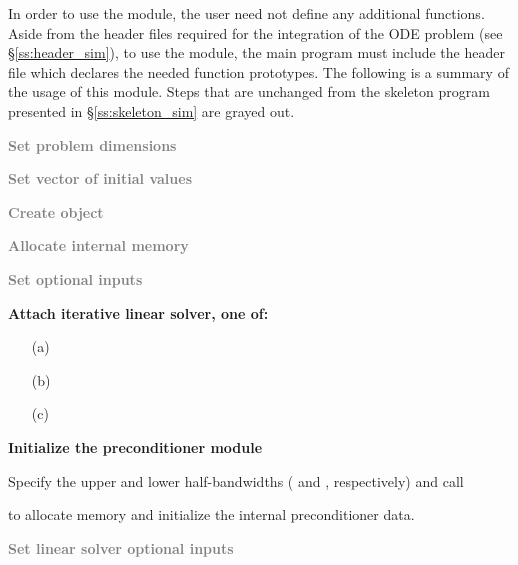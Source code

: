 In order to use the {\cvbandpre} module, the user need not define any
additional functions. 
Aside from the header files required for the integration of the ODE problem
(see \S\ref{ss:header_sim}),  to use the {\cvbandpre} module, the main program 
must include the header file  which declares the needed
function prototypes.
The following is a summary of the usage of this module. Steps that are unchanged from the skeleton
program presented in \S\ref{ss:skeleton_sim} are grayed out.
\begin{Steps}
  
\item
  \textcolor{gray}{\bf Set problem dimensions}

\item
  \textcolor{gray}{\bf Set vector of initial values}
 
\item
  \textcolor{gray}{\bf Create {\cvode} object}

\item
  \textcolor{gray}{\bf Allocate internal memory}

\item
  \textcolor{gray}{\bf Set optional inputs}

\item \label{i:bandpre_attach}
  {\bf Attach iterative linear solver, one of:}

  \begin{itemize}
  \item[(a) ] 
  \item[(b) ] 
  \item[(c) ] 
  \end{itemize}

\item \label{i:bandpre_init}
  {\bf Initialize the {\cvbandpre} preconditioner module}

  Specify the upper and lower half-bandwidths ( and , respectively) and call 


  to allocate memory and initialize the internal preconditioner data.

\item
  \textcolor{gray}{\bf Set linear solver optional inputs}


\end{Steps}
